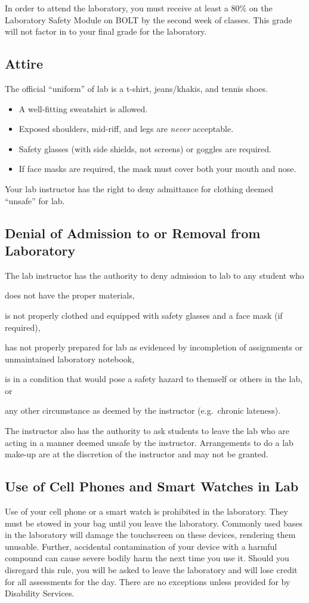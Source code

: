 \documentclass[11pt,letterpaper]{article}
\begin{document}
In order to attend the laboratory, you must receive at least a 80\% on the
Laboratory Safety Module on BOLT by the second week of classes. This grade will
not factor in to your final grade for the laboratory.

\subsection{Attire}
The official ``uniform'' of lab is a t-shirt, jeans/khakis, and tennis shoes.
\begin{itemize}[nosep]
	\item A well-fitting sweatshirt is allowed.
	\item Exposed shoulders, mid-riff, and legs are \emph{never} acceptable.
	\item Safety glasses (with side shields, not screens) or goggles are
		required.
	\item If face masks are required, the mask must cover both your mouth
		and nose.
\end{itemize}
Your lab instructor has the right to deny admittance for clothing deemed
``unsafe'' for lab.

\subsection{Denial of Admission to or Removal from Laboratory}
The lab instructor has the authority to deny admission to lab to any student who
\begin{enumerate*}[label={(\arabic*)}]
	\item does not have the proper materials,
	\item is not properly clothed and equipped with safety glasses and a
		face mask (if required), 
	\item has not properly prepared for lab as evidenced by incompletion
		of assignments or unmaintained laboratory notebook,
	\item is in a condition that would pose a safety hazard to themself or others in the lab, or
	\item any other circumstance as deemed by the instructor (e.g.\ chronic lateness).
\end{enumerate*}
The instructor also has the authority to ask students to leave the lab who are
acting in a manner deemed unsafe by the instructor. Arrangements to do a lab make-up are at the
discretion of the instructor and may not be granted. 

\subsection{Use of Cell Phones and Smart Watches in Lab}
Use of your cell phone or a smart watch is prohibited in the laboratory. They
must be stowed in your bag until you leave the laboratory. Commonly used bases
in the laboratory will damage the touchscreen on these devices, rendering them
unusable. Further, accidental contamination of your device with a harmful
compound can cause severe bodily harm the next time you use it. Should you
disregard this rule, you will be asked to leave the laboratory and will lose
credit for all assessments for the day. There are no exceptions unless provided
for by Disability Services.
\end{document}
